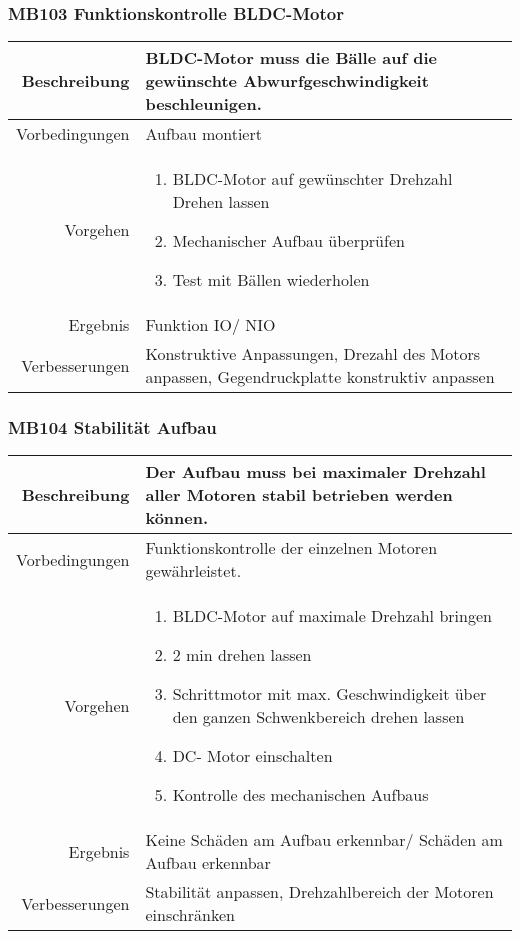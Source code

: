 \subsubsection{MB103 Funktionskontrolle BLDC-Motor}
\begin{table}[h!]
	\renewcommand{\arraystretch}{1.5}
	\begin{tabular}{|r|p{13cm}|}
		\hline Beschreibung & BLDC-Motor muss die Bälle auf die gewünschte Abwurfgeschwindigkeit beschleunigen.  \\ 
		\hline Vorbedingungen & Aufbau montiert \\ 
		\hline Vorgehen & 
		\begin{enumerate}
			\item BLDC-Motor auf gewünschter Drehzahl Drehen lassen 
			\item Mechanischer Aufbau überprüfen
			\item Test mit Bällen wiederholen 
		\end{enumerate} \\ 
		\hline Ergebnis & Funktion IO/ NIO \\ 
		\hline Verbesserungen & Konstruktive Anpassungen, Drezahl des Motors anpassen, Gegendruckplatte konstruktiv anpassen \\ 
		\hline 
	\end{tabular}
\end{table}

\subsubsection{MB104 Stabilität Aufbau}
\begin{table}[h!]
	\renewcommand{\arraystretch}{1.5}
	\begin{tabular}{|r|p{13cm}|}
		\hline Beschreibung & Der Aufbau muss bei maximaler Drehzahl aller Motoren stabil betrieben werden können. \\ 
		\hline Vorbedingungen & Funktionskontrolle der einzelnen Motoren gewährleistet. \\ 
		\hline Vorgehen & 
		\begin{enumerate}
			\item BLDC-Motor auf maximale Drehzahl bringen
			\item 2 min drehen lassen 
			\item Schrittmotor mit max. Geschwindigkeit über den ganzen Schwenkbereich drehen lassen  
			\item DC- Motor einschalten
			\item Kontrolle des mechanischen Aufbaus
		\end{enumerate} \\ 
		\hline Ergebnis & Keine Schäden am Aufbau erkennbar/ Schäden am Aufbau erkennbar \\ 
		\hline Verbesserungen & Stabilität anpassen, Drehzahlbereich der Motoren einschränken \\ 
		\hline 
	\end{tabular}
\end{table}
\newpage

